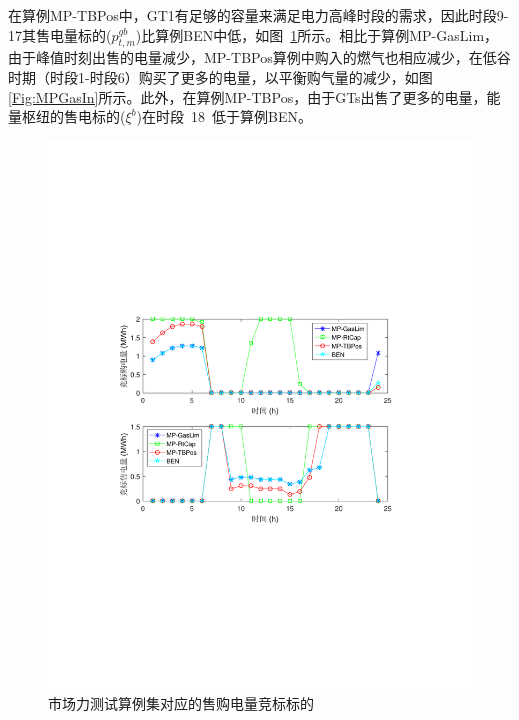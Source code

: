在算例{MP-TBPos}中，GT1有足够的容量来满足电力高峰时段的需求，因此时段9-17其售电量标的($p_{t,m}^{gb}$)比算例{BEN}中低，如图~\ref{Fig:MPPInOut}所示。相比于算例{MP-GasLim}，由于峰值时刻出售的电量减少，{MP-TBPos}算例中购入的燃气也相应减少，在低谷时期（时段1-时段6）购买了更多的电量，以平衡购气量的减少，如图
\ref{Fig:MPGasIn}所示。此外，在算例{MP-TBPos}，由于GTs出售了更多的电量，能量枢纽的售电标的($\xi^b$)在时段~18~低于算例{BEN}。
\begin{figure}[!htp]
\centering
\includegraphics[scale=0.70]{figures/Chap4-15-MPComElQuan.pdf}
\caption{市场力测试算例集对应的售购电量竞标标的}
\label{Fig:MPPInOut}
\end{figure}
